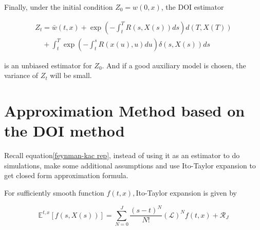 Finally, under the initial condition $Z_0 = w(0,x)$, the DOI estimator

\begin{equation}
    \begin{gathered}
        Z_t =\bar{w}(t, x)+\exp \left(-\int_{t}^{T} R(s,X(s)) d s\right) d(T,X(T)) \\
        \quad+\int_{t}^{T} \exp \left(-\int_{t}^{s} R(x(u), u) d u\right) \delta(s,X(s))d s
        \end{gathered}
\end{equation}

\noindent is an unbiased estimator for $Z_0$. And if a good auxiliary model is chosen,  the variance of $Z_t$ will be small.








\section{Approximation Method based on the DOI method}
\label{sec: 2.2}

Recall equation\eqref{feynman-kac rep}, instead of using it as an estimator to do simulations, \cite{kristensen_adding_2011} make some additional assumptions and use Ito-Taylor expansion to get closed form approximation formula.

For sufficiently smooth function $f(t,x), $Ito-Taylor expansion is given by

\begin{equation}
    \mathbb{E}^{t, x}[f(s, X(s))]=\sum_{N=0}^{J} \frac{(s-t)^{N}}{N !}\left(\mathcal{L}\right)^{N} f(t, x)+\mathcal{R}_{J}
\end{equation}

